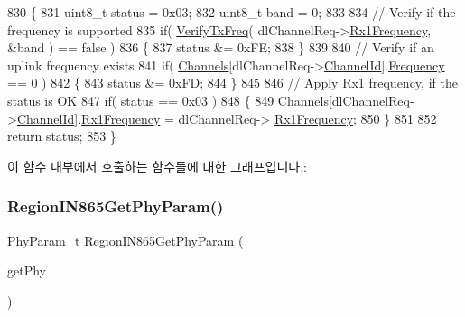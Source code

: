 \begin{DoxyCode}
830 \{
831     uint8\_t status = 0x03;
832     uint8\_t band = 0;
833 
834     \textcolor{comment}{// Verify if the frequency is supported}
835     \textcolor{keywordflow}{if}( \mbox{\hyperlink{_region_i_n865_8c_a827497ee67461abdb257e1ff3f7e78e6}{VerifyTxFreq}}( dlChannelReq->\mbox{\hyperlink{structs_dl_channel_req_params_a8a564b8635b12d5f0f348ae177dd92e1}{Rx1Frequency}}, &band ) == \textcolor{keyword}{false} )
836     \{
837         status &= 0xFE;
838     \}
839 
840     \textcolor{comment}{// Verify if an uplink frequency exists}
841     \textcolor{keywordflow}{if}( \mbox{\hyperlink{_region_i_n865_8c_adad6dcb99199b5142166021a8aac9aa2}{Channels}}[dlChannelReq->\mbox{\hyperlink{structs_dl_channel_req_params_ae23f953dc29c360e56a3c856404a3276}{ChannelId}}].\mbox{\hyperlink{structs_channel_params_ade3d190636488dad9a89b19446b7acf1}{Frequency}} == 0 )
842     \{
843         status &= 0xFD;
844     \}
845 
846     \textcolor{comment}{// Apply Rx1 frequency, if the status is OK}
847     \textcolor{keywordflow}{if}( status == 0x03 )
848     \{
849         \mbox{\hyperlink{_region_i_n865_8c_adad6dcb99199b5142166021a8aac9aa2}{Channels}}[dlChannelReq->\mbox{\hyperlink{structs_dl_channel_req_params_ae23f953dc29c360e56a3c856404a3276}{ChannelId}}].\mbox{\hyperlink{structs_channel_params_a8a564b8635b12d5f0f348ae177dd92e1}{Rx1Frequency}} = dlChannelReq->
      \mbox{\hyperlink{structs_dl_channel_req_params_a8a564b8635b12d5f0f348ae177dd92e1}{Rx1Frequency}};
850     \}
851 
852     \textcolor{keywordflow}{return} status;
853 \}
\end{DoxyCode}
이 함수 내부에서 호출하는 함수들에 대한 그래프입니다.\+:
\mbox{\label{group___r_e_g_i_o_n_i_n865_ga209a89a7195dbbee8428bbcd0133d986}} 
\subsubsection{\texorpdfstring{Region\+I\+N865\+Get\+Phy\+Param()}{RegionIN865GetPhyParam()}}
{\footnotesize\ttfamily \mbox{\hyperlink{group___r_e_g_i_o_n_gaed159b26e5c4677236b6e8677019db30}{Phy\+Param\+\_\+t}} Region\+I\+N865\+Get\+Phy\+Param (\begin{DoxyParamCaption}\item[{\mbox{\hyperlink{group___r_e_g_i_o_n_gab471483fff904f4f89bbc03f7fc380ab}{Get\+Phy\+Params\+\_\+t}} $\ast$}]{get\+Phy }\end{DoxyParamCaption})}




